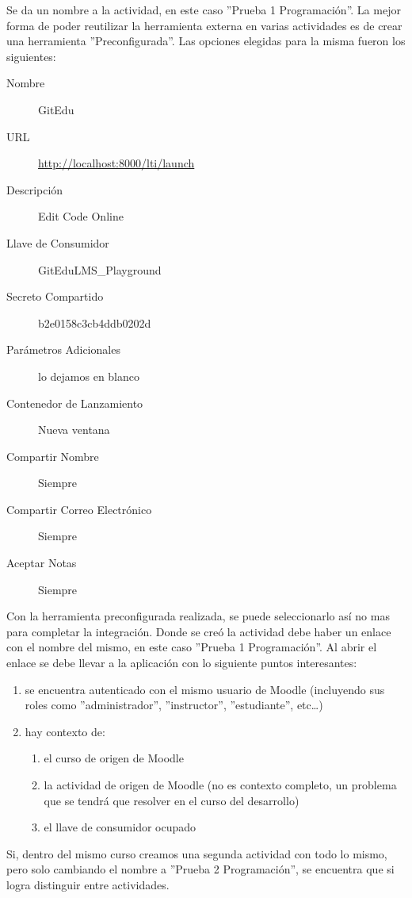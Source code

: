 Se da un nombre a la actividad, en este caso ''Prueba 1 Programación''. La mejor forma de poder reutilizar la herramienta externa en varias actividades es de crear una herramienta ''Preconfigurada''. Las opciones elegidas para la misma fueron los siguientes:
\begin{description}
	\item[Nombre] GitEdu
    \item[URL] \url{http://localhost:8000/lti/launch}
    \item[Descripción] Edit Code Online
    \item[Llave de Consumidor] GitEduLMS\_Playground
    \item[Secreto Compartido] b2e0158c3cb4ddb0202d
    \item[Parámetros Adicionales] lo dejamos en blanco
    \item[Contenedor de Lanzamiento] Nueva ventana
    \item[Compartir Nombre] Siempre
    \item[Compartir Correo Electrónico] Siempre
    \item[Aceptar Notas] Siempre
\end{description}
Con la herramienta preconfigurada realizada, se puede seleccionarlo así no mas para completar la integración. Donde se creó la actividad debe haber un enlace con el nombre del mismo, en este caso ''Prueba 1 Programación''. Al abrir el enlace se debe llevar a la aplicación con lo siguiente puntos interesantes:
\begin{enumerate}
	\item se encuentra autenticado con el mismo usuario de Moodle (incluyendo sus roles como ''administrador'', ''instructor'', ''estudiante'', etc\ldots{})
    \item hay contexto de:
    \begin{enumerate}
    	\item el curso de origen de Moodle
        \item la actividad de origen de Moodle (no es contexto completo, un problema que se tendrá que resolver en el curso del desarrollo)
        \item el llave de consumidor ocupado
    \end{enumerate}
\end{enumerate}

Si, dentro del mismo curso creamos una segunda actividad con todo lo mismo, pero solo cambiando el nombre a ''Prueba 2 Programación'', se encuentra que si logra distinguir entre actividades.

